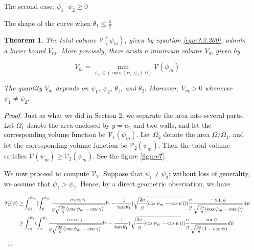 \documentclass[letterpaper,reqno,10pt,twoside]{amsart}
\newtheorem{theorem}{Theorem}[section]
\theoremstyle{definition}
\theoremstyle{remark}
\begin{document}
\begin{section}{The second case: $\psi_1\cdot \psi_2\geq 0$ }
\begin{subsection}{The shape of the curve when $\theta_1\leq \frac{\pi}{2}$}
        \begin{theorem}

        The total volume ${\mathscr{V}}(\psi_m)$, given by equation \eqref{equ:3.2.200}, admits a lower bound $V_m$. More precisely, there exists a minimum volume $V_{m}$ given by

        \begin{equation*}
             V_{m}=\min_{\psi_m \in(\max(\psi_1,\psi_2),0)}\mathscr{V}(\psi_m)
        \end{equation*}

        \noindent The quantity $V_m$ depends on $\psi_1$, $\psi_2$, $\theta_1$, and $\theta_2$. Moreover, $V_m>0$ whenever $\psi_1\neq \psi_2$.
        \end{theorem}
        

        \begin{proof}
        
        Just as what we did in Section 2, we separate the area into several parts. Let $\Omega_{1}$ denote the area enclosed by $y=u_2$ and two walls, and let the corresponding volume function be ${\mathscr{V}}_1(\psi_m)$. Let $\Omega_{2}$ denote the area $\Omega/\Omega_{1}$, and let the corresponding volume function be ${\mathscr{V}}_2(\psi_m)$.  Then the total volume satisfies ${\mathscr{V}}(\psi_m)\geq {\mathscr{V}}_2(\psi_m)$. See the figure \ref{figure7}.

        We now proceed to compute $\mathscr{V}_{2}$. Suppose that $\psi_{1}\neq \psi_{2}$; without loss of generality, we assume that $\psi_{1}>\psi_{2}$. Hence, by a direct geometric observation, we have

        \begin{equation}{\label{equ:V_2}}
        \begin{aligned}
            \mathscr{V}_{2}(\psi)\geq& \int_{\psi_{2}}^{\psi_{m}}(\int_{\psi}^{\psi_{m}}\frac{\sigma\cos\gamma}{g\sqrt{\frac{2\sigma}{g}(\cos\psi_m-\cos\gamma)}}d\gamma -\frac{1}{\tan\theta_{1}}(\sqrt{\frac{2\sigma}{g}(\cos\psi_{m}-\cos\psi)}))\frac{\sigma}{g}\frac{-\sin\psi}{\sqrt{\frac{2\sigma}{g}(\cos\psi_{m}-\cos\psi)}}d\psi\\
            \geq& \int_{\psi_{2}}^{\psi_{1}}(\int_{\psi}^{\psi_{1}}\frac{\sigma\cos\gamma}{g\sqrt{\frac{2\sigma}{g}(\cos\psi_m-\cos\gamma)}}d\gamma-\frac{1}{\tan\theta_{1}}(\sqrt{\frac{2\sigma}{g}(\cos\psi_{m}-\cos\psi)}))\frac{\sigma}{g}\frac{-\sin\psi}{\sqrt{\frac{2\sigma}{g}(1-\cos\psi)}}d\psi
        \end{aligned}
        \end{equation}


\end{proof}
\end{subsection}
\end{section}
\end{document}
